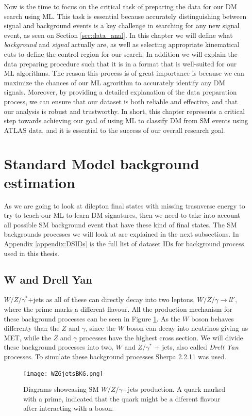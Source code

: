 \documentclass[12pt, a4paper]{book}
\begin{document}
Now is the time to focus on the critical task of preparing the data for our DM search using ML. This task is essential because accurately distinguishing between signal and background events is a key challenge in searching for any new signal event, 
as seen on Section \ref{sec:data_anal}. In this chapter we will define what \textit{background} and \textit{signal} actually are, as well as selecting appropriate kinematical cuts to define the control region for our search. In addition we will 
explain the data preparing procedure such that it is in a format that is well-suited for our ML algorithms. The reason this process is of great importance is because we can maximize the chances of our ML agrorithm to accurately identify any DM signals. 
Moreover, by providing a detailed explanation of the data preparation process, we can ensure that our dataset is both reliable and effective, and that our analysis is robust and trustworthy. In short, this chapter represents a critical step towards 
achieving our goal of using ML to classify DM from SM events using ATLAS data, and it is essential to the success of our overall research goal.



\clearpage
\section{Standard Model background estimation}
As we are going to look at dilepton final states with missing trasnverse energy to try to teach our ML to learn DM signatures, then we need to take into account all possible SM background event that have these kind of final states. The SM backgrounds processes we will look at are explained in the next subsections. 
In Appendix \ref{appendix:DSIDs} is the full list of dataset IDs for background process used in this thesis.

\subsection{W and Drell Yan}
$W/Z/\gamma^*$+jets as all of these can directly decay into two leptons, $W/Z/\gamma\rightarrow ll'$, where the prime marks a different flavour. All the production mechanism for these background processes can 
be seen in Figure \ref{fig:WZG_BKG}. As the $W$ boson behaves differenty than the $Z$ and $\gamma$, since the $W$ boson can decay into neutrinos giving us MET, while the $Z$ and $\gamma$ processes have the highest cross section. We will divide 
these background processes into two, $W$ and $Z/\gamma^*$ + jets, also called \textit{Drell Yan} processes. To simulate these background processes Sherpa 2.2.11 \cite{Sherpa} was used.
\graphicspath{{../../figures/}}
\begin{figure}[!ht]
    \centering
    \texttt{[image: WZGjetsBKG.png]}
    \caption[$W/Z/\gamma$+jets production]{Diagrams showcasing SM $W/Z/\gamma$+jets production. A quark marked with a prime, indicated that the quark might be a diferent flavour after interacting with a boson.}\label{fig:WZG_BKG}
\end{figure}
\end{document}
